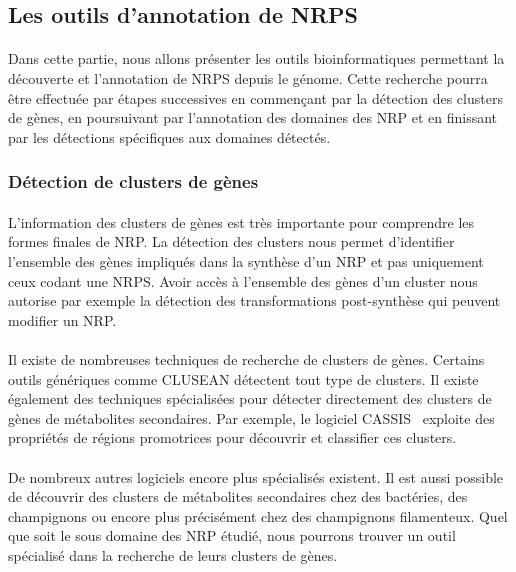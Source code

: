\documentclass[12pt,french,twoside]{report}
\begin{document}
\subsection{Les outils d'annotation de NRPS}

\paragraph{}Dans cette partie, nous allons présenter les outils bioinformatiques permettant la découverte et l'annotation de NRPS depuis le génome.
Cette recherche pourra être effectuée par étapes successives en commençant par la détection des clusters de gènes, en poursuivant par l'annotation des domaines des NRP et en finissant par les détections spécifiques aux domaines détectés.

\subsubsection{Détection de clusters de gènes}

\paragraph{}L'information des clusters de gènes est très importante pour comprendre les formes finales de NRP.
La détection des clusters nous permet d'identifier l'ensemble des gènes impliqués dans la synthèse d'un NRP et pas uniquement ceux codant une NRPS.
Avoir accès à l'ensemble des gènes d'un cluster nous autorise par exemple la détection des transformations post-synthèse qui peuvent modifier un NRP.

\paragraph{}Il existe de nombreuses techniques de recherche de clusters de gènes.
Certains outils génériques comme CLUSEAN\cite{weber_clusean:_2009} détectent tout type de clusters.
Il existe également des techniques spécialisées pour détecter directement des clusters de gènes de métabolites secondaires.
Par exemple, le logiciel CASSIS~\cite{wolf_cassis_2016} exploite des propriétés de régions promotrices pour découvrir et classifier ces clusters.

\paragraph{}De nombreux autres logiciels encore plus spécialisés existent.
Il est aussi possible de découvrir des clusters de métabolites secondaires chez des bactéries\cite{cruz-morales_recapitulation_2015}, des champignons\cite{khaldi_smurf:_2010} ou encore plus précisément chez des champignons filamenteux\cite{andersen_accurate_2013,umemura_motif-independent_2015}.
Quel que soit le sous domaine des NRP étudié, nous pourrons trouver un outil spécialisé dans la recherche de leurs clusters de gènes.
\end{document}
